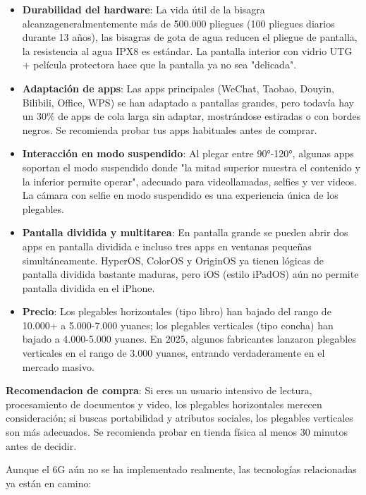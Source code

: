 \begin{itemize}
  \item \textbf{Durabilidad del hardware}: La vida útil de la bisagra alcanzageneralmentemente más de 500.000 pliegues (100 pliegues diarios durante 13 años), las bisagras de gota de agua reducen el pliegue de pantalla, la resistencia al agua IPX8 es estándar. La pantalla interior con vidrio UTG + película protectora hace que la pantalla ya no sea "delicada".
  \item \textbf{Adaptación de apps}: Las apps principales (WeChat, Taobao, Douyin, Bilibili, Office, WPS) se han adaptado a pantallas grandes, pero todavía hay un 30\% de apps de cola larga sin adaptar, mostrándose estiradas o con bordes negros. Se recomienda probar tus apps habituales antes de comprar.
  \item \textbf{Interacción en modo suspendido}: Al plegar entre 90°-120°, algunas apps soportan el modo suspendido donde "la mitad superior muestra el contenido y la inferior permite operar", adecuado para videollamadas, selfies y ver videos. La cámara con selfie en modo suspendido es una experiencia única de los plegables.
  \item \textbf{Pantalla dividida y multitarea}: En pantalla grande se pueden abrir dos apps en pantalla dividida e incluso tres apps en ventanas pequeñas simultáneamente. HyperOS, ColorOS y OriginOS ya tienen lógicas de pantalla dividida bastante maduras, pero iOS (estilo iPadOS) aún no permite pantalla dividida en el iPhone.
  \item \textbf{Precio}: Los plegables horizontales (tipo libro) han bajado del rango de 10.000+ a 5.000-7.000 yuanes; los plegables verticales (tipo concha) han bajado a 4.000-5.000 yuanes. En 2025, algunos fabricantes lanzaron plegables verticales en el rango de 3.000 yuanes, entrando verdaderamente en el mercado masivo.
\end{itemize}

\textbf{Recomendacion de compra}: Si eres un usuario intensivo de lectura, procesamiento de documentos y video, los plegables horizontales merecen consideración; si buscas portabilidad y atributos sociales, los plegables verticales son más adecuados. Se recomienda probar en tienda física al menos 30 minutos antes de decidir.


Aunque el 6G aún no se ha implementado realmente, las tecnologías relacionadas ya están en camino:


